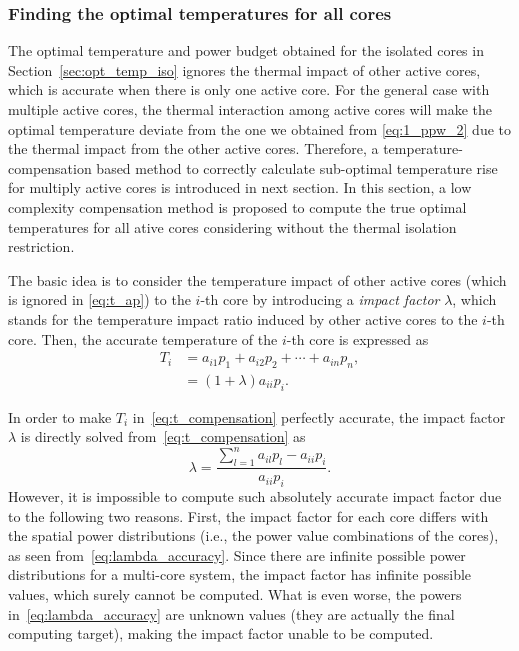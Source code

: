 \subsubsection{Finding the optimal temperatures for all cores}

The optimal temperature and power budget obtained for the
isolated cores in Section~\ref{sec:opt_temp_iso} ignores the thermal impact of other active cores, which
is accurate when there is only one active core. For the general
case with multiple active cores, the thermal interaction among active
cores will make the optimal temperature deviate from the one we
obtained from \eqref{eq:1_ppw_2} due to the thermal impact from the
other active cores. Therefore, a temperature-compensation based method to correctly calculate sub-optimal temperature rise for multiply active cores is introduced in next section.
In this section, a low complexity compensation method is proposed to compute the true
optimal temperatures for all ative cores considering without the
thermal isolation restriction.

The basic idea is to consider the temperature
impact of other active cores (which is ignored in \eqref{eq:t_ap}) to the $i$-th core by introducing a
\emph{impact factor} $\lambda$, which stands for the temperature
impact ratio induced by
other active cores to the $i$-th core. Then, the accurate temperature of the $i$-th core is expressed as
\begin{equation}\label{eq:t_compensation}
\begin{split}
T_{i} &=a_{i1}p_{1} + a_{i2}p_{2} +\cdots + a_{in}p_{n},\\
&=(1+\lambda)a_{ii}p_{i}.
\end{split}
\end{equation}

In order to make $T_i$ in~\eqref{eq:t_compensation} perfectly accurate, the
impact factor $\lambda$ is directly solved
from~\eqref{eq:t_compensation} as
\begin{equation}\label{eq:lambda_accuracy}
\lambda =\frac{\sum_{l=1}^{n}a_{il}p_{l}-a_{ii}p_{i}}{a_{ii}p_{i}}.
\end{equation}
However, it is impossible to compute such absolutely accurate impact
factor due to the following two reasons. First, the impact factor for
each core differs with the spatial power distributions (i.e., the
power value combinations of the cores), as seen from~\eqref{eq:lambda_accuracy}. Since there are
infinite possible power distributions for a multi-core system, the impact
factor has infinite possible values, which surely cannot be computed. What is even worse, the powers
in~\eqref{eq:lambda_accuracy} are unknown values (they are actually
the final computing target), making the impact factor unable to be computed.

